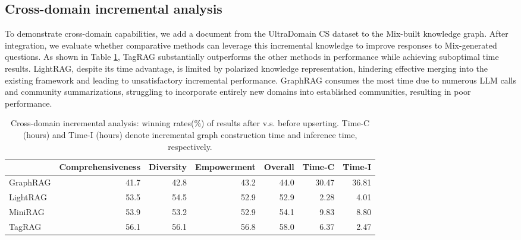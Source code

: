 \documentclass[11pt]{article}
\begin{document}
\subsection{Cross-domain incremental analysis}
To demonstrate cross-domain capabilities, we add a document from the UltraDomain CS dataset to the Mix-built knowledge graph. After integration, we evaluate whether comparative methods can leverage this incremental knowledge to improve responses to Mix-generated questions.
As shown in Table \ref{tab:cross-domain incremental analysis}, TagRAG substantially outperforms the other methods in performance while achieving suboptimal time results.
LightRAG, despite its time advantage, is limited by polarized knowledge representation, hindering effective merging into the existing framework and leading to unsatisfactory incremental performance.
GraphRAG consumes the most time due to numerous LLM calls and community summarizations, struggling to incorporate entirely new domains into established communities, resulting in poor performance.



\begin{table}[t]
\centering
\small
\begin{tabular}{lrrrrrr}
\toprule
& Comprehensiveness & Diversity & Empowerment & Overall & Time-C & Time-I \\ \midrule
GraphRAG & 41.7& 42.8& 43.2& 44.0& 30.47 & 36.81 \\
LightRAG & 53.5& 54.5& 52.9& 52.9& 2.28 & 4.01 \\
MiniRAG & 53.9& 53.2& 52.9& 54.1& 9.83 & 8.80 \\
TagRAG & 56.1& 56.1& 56.8& 58.0& 6.37 & 2.47 \\
\bottomrule
\end{tabular}
\caption{Cross-domain incremental analysis: winning rates(\%) of results after v.s. before upserting. Time-C (hours) and Time-I (hours) denote incremental graph construction time and inference time, respectively.}
\label{tab:cross-domain incremental analysis}
\end{table}
\end{document}
